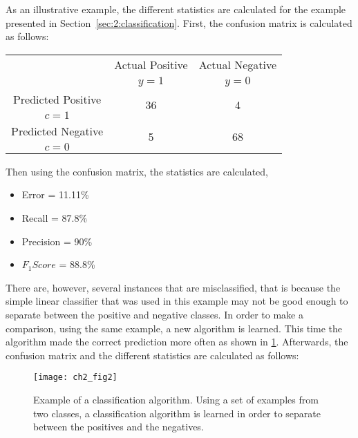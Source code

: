  \newpage
  As an illustrative example, the different statistics are calculated for the example presented 
  in Section~\ref{sec:2:classification}. First, the confusion matrix is calculated as 
  follows:
  \begin{center}
    \footnotesize
  \begin{tabular}{c|c|c}
    \multicolumn{1}{c|}{}  & Actual Positive& Actual Negative \\
    \multicolumn{1}{c|}{} & $y=1$& $y=0$ \\
    \hline
    Predicted Positive    & \multirow{ 2}{*}{36} & \multirow{ 
    2}{*}{4} \\
    $c=1$ & &\\
    \hline
    Predicted Negative    & \multirow{ 2}{*}{5} & \multirow{ 
    2}{*}{68} \\
    $c=0$ & &\\
  \end{tabular}
  \end{center}
  Then using the confusion matrix, the statistics are calculated,
 	\begin{itemize}
  	\item Error = 11.11\%
		\item Recall = 87.8\%
		\item Precision = 90\%
		\item $F_1Score$ = 88.8\%
	\end{itemize}
	
There are, however, several instances that are misclassified, that is because the simple linear 
classifier that was used in this example may not be good enough to separate between the positive 
and negative classes. In order to make a comparison, using the same example, a new 
algorithm is learned. This time the algorithm made the correct prediction more often as shown in 
\figurename{ \ref{fig:2:3}}. Afterwards, the confusion matrix and the different statistics are 
calculated as follows:

\begin{figure}[t!]
  \centering
  \texttt{[image: ch2\_fig2]}
  \caption{Example of a classification algorithm. Using a set of examples from two classes, a 
  classification algorithm is learned in order to separate between the positives and the negatives. 
}
  \label{fig:2:3}
\end{figure}

